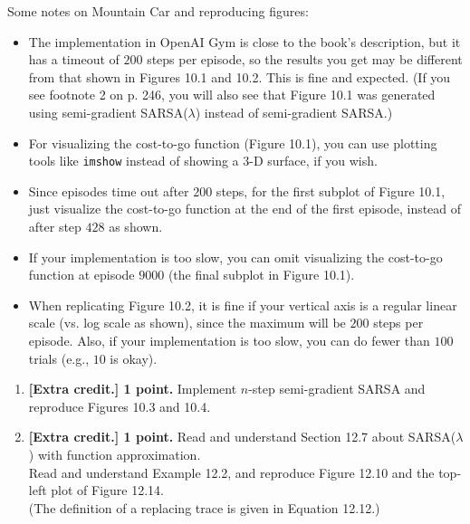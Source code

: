 \documentclass{article}
\begin{document}
\begin{enumerate}
Some notes on Mountain Car and reproducing figures:
\begin{itemize}
\item The implementation in OpenAI Gym is close to the book's description, but it has a timeout of $200$ steps per episode, so the results you get may be different from that shown in Figures 10.1 and 10.2. This is fine and expected. (If you see footnote 2 on p. 246, you will also see that Figure 10.1 was generated using semi-gradient SARSA($\lambda$) instead of semi-gradient SARSA.)
\item For visualizing the cost-to-go function (Figure 10.1), you can use plotting tools like \texttt{imshow} instead of showing a $3$-D surface, if you wish.
\item Since episodes time out after $200$ steps, for the first subplot of Figure 10.1, just visualize the cost-to-go function at the end of the first episode, instead of after step $428$ as shown.
\item If your implementation is too slow, you can omit visualizing the cost-to-go function at episode $9000$ (the final subplot in Figure 10.1).
\item When replicating Figure 10.2, it is fine if your vertical axis is a regular linear scale (vs. log scale as shown), since the maximum will be $200$ steps per episode. Also, if your implementation is too slow, you can do fewer than $100$ trials (e.g., $10$ is okay).
\end{itemize}

\begin{enumerate}[resume]
\item \textbf{[Extra credit.] 1 point.} Implement $n$-step semi-gradient SARSA and reproduce Figures 10.3 and 10.4.
\item \textbf{[Extra credit.] 1 point.} Read and understand Section 12.7 about SARSA($\lambda$) with function approximation. \\
Read and understand Example 12.2, and reproduce Figure 12.10 and the top-left plot of Figure 12.14. \\
(The definition of a replacing trace is given in Equation 12.12.)

\end{enumerate}
\end{enumerate}
\end{document}
